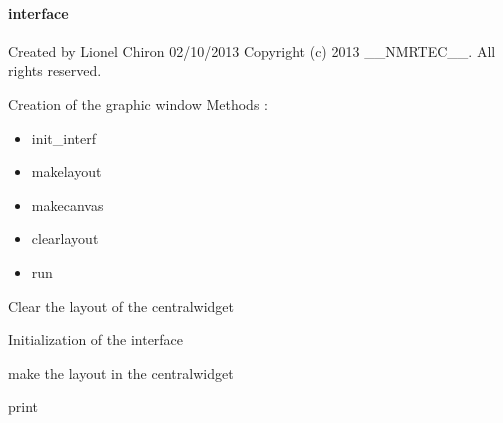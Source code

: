 \documentclass[letterpaper,10pt,openany,oneside]{sphinxmanual}
\begin{document}
\paragraph{interface}
\label{rst/visu2d:interface}\label{rst/visu2d:module-Visu.interface}
Created by Lionel Chiron  02/10/2013 
Copyright (c) 2013 \_\_NMRTEC\_\_. All rights reserved.

\begin{fulllineitems}
\label{rst/visu2d:Visu.interface.INTERFACE}
Creation of the graphic window  
Methods :
\begin{itemize}
\item {} 
init\_interf

\item {} 
makelayout

\item {} 
makecanvas

\item {} 
clearlayout

\item {} 
run

\end{itemize}

\begin{fulllineitems}
\label{rst/visu2d:Visu.interface.INTERFACE.clearlayout}
Clear the layout of the centralwidget

\end{fulllineitems}


\begin{fulllineitems}
\label{rst/visu2d:Visu.interface.INTERFACE.init_interf}
Initialization of the interface

\end{fulllineitems}


\begin{fulllineitems}
\label{rst/visu2d:Visu.interface.INTERFACE.makelayout}
make the layout in the centralwidget

\end{fulllineitems}


\begin{fulllineitems}
\label{rst/visu2d:Visu.interface.INTERFACE.pr}
print

\end{fulllineitems}


\end{fulllineitems}
\end{document}
